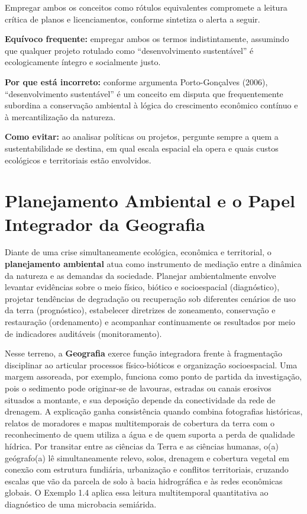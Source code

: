 Empregar ambos os conceitos como rótulos equivalentes compromete a leitura crítica de planos e licenciamentos, conforme sintetiza o alerta a seguir.

\begin{boxErro}
\textbf{Equívoco frequente:} empregar ambos os termos indistintamente, assumindo que qualquer projeto rotulado como ``desenvolvimento sustentável'' é ecologicamente íntegro e socialmente justo.

\textbf{Por que está incorreto:} conforme argumenta Porto-Gonçalves (2006), ``desenvolvimento sustentável'' é um conceito em disputa que frequentemente subordina a conservação ambiental à lógica do crescimento econômico contínuo e à mercantilização da natureza.

\textbf{Como evitar:} ao analisar políticas ou projetos, pergunte sempre a quem a sustentabilidade se destina, em qual escala espacial ela opera e quais custos ecológicos e territoriais estão envolvidos.
\end{boxErro}

\section{Planejamento Ambiental e o Papel Integrador da Geografia}

Diante de uma crise simultaneamente ecológica, econômica e territorial, o \textbf{planejamento ambiental} atua como instrumento de mediação entre a dinâmica da natureza e as demandas da sociedade. Planejar ambientalmente envolve levantar evidências sobre o meio físico, biótico e socioespacial (diagnóstico), projetar tendências de degradação ou recuperação sob diferentes cenários de uso da terra (prognóstico), estabelecer diretrizes de zoneamento, conservação e restauração (ordenamento) e acompanhar continuamente os resultados por meio de indicadores auditáveis (monitoramento).

Nesse terreno, a \textbf{Geografia} exerce função integradora frente à fragmentação disciplinar ao articular processos físico-bióticos e organização socioespacial. Uma margem assoreada, por exemplo, funciona como ponto de partida da investigação, pois o sedimento pode originar-se de lavouras, estradas ou canais erosivos situados a montante, e sua deposição depende da conectividade da rede de drenagem. A explicação ganha consistência quando combina fotografias históricas, relatos de moradores e mapas multitemporais de cobertura da terra com o reconhecimento de quem utiliza a água e de quem suporta a perda de qualidade hídrica. Por transitar entre as ciências da Terra e as ciências humanas, o(a) geógrafo(a) lê simultaneamente relevo, solos, drenagem e cobertura vegetal em conexão com estrutura fundiária, urbanização e conflitos territoriais, cruzando escalas que vão da parcela de solo à bacia hidrográfica e às redes econômicas globais. O Exemplo 1.4 aplica essa leitura multitemporal quantitativa ao diagnóstico de uma microbacia semiárida.

